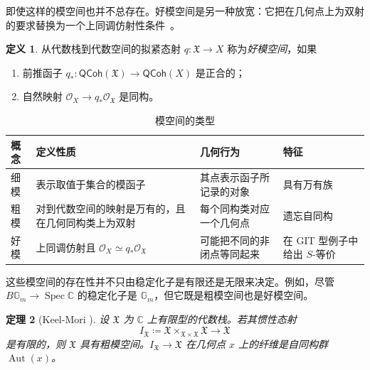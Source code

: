 \documentclass{amsart}
\newtheorem{thm}{定理}[section]
\theoremstyle{definition}
\newtheorem{defn}[thm]{定义}
\theoremstyle{remark}
\theoremstyle{plain}
\theoremstyle{definition}
\theoremstyle{remark}
\newcommand{\G}{\mathbb{G}}
\newcommand{\C}{\mathbb{C}}
\newcommand{\mc}[1]{\mathcal{#1}}
\newcommand{\mf}[1]{\mathfrak{#1}}
\newcommand{\on}[1]{\operatorname{#1}}
\newcommand{\ms}[1]{\mathsf{#1}}
\newcommand{\1}{\mathbf{1}}
\newcommand{\2}{\mathbf{2}}
\newcommand{\3}{\mathbf{3}}
\begin{document}
即使这样的模空间也并不总存在。好模空间是另一种放宽：它把在几何点上为双射的要求替换为一个上同调仿射性条件~\cite{Alper2013}。

\begin{defn}
    从代数栈到代数空间的拟紧态射 \(q\colon\mf{X}\to X\) 称为\textit{好模空间}，如果
    \begin{enumerate}
        \item 前推函子 \(q_*\colon\ms{QCoh}(\mf{X})\to\ms{QCoh}(X)\) 是正合的；
        \item 自然映射 \(\mc{O}_X\to q_*\mc{O}_{\mf{X}}\) 是同构。
    \end{enumerate}
\end{defn}

\begin{table}[htpb]
    \centering
    \caption{模空间的类型}
    \label{tab:moduli-types-corrected}
    \renewcommand{\arraystretch}{1.3}
    \begin{tabular}{
        p{}
        p{}
        p{}
        p{}
    }
        \toprule
        \textbf{概念}
        & \textbf{定义性质}
        & \textbf{几何行为}
        & \textbf{特征}
        \\
        \midrule
        细模
        & 表示取值于集合的模函子
        & 其点表示函子所记录的对象
        & 具有万有族
        \\
        粗模
        & 对到代数空间的映射是万有的，且在几何同构类上为双射
        & 每个同构类对应一个几何点
        & 遗忘自同构
        \\
        好模
        & 上同调仿射且
          \(\mc{O}_X \simeq q_*\mc{O}_{\mf{X}}\)
        & 可能把不同的非闭点等同起来
        & 在 GIT 型例子中给出 \(S\)-等价
        \\
        \bottomrule
    \end{tabular}
\end{table}

这些模空间的存在性并不只由稳定化子是有限还是无限来决定。例如，尽管 \(B\G_m\to\on{Spec}\C\) 的稳定化子是 \(\G_m\)，但它既是粗模空间也是好模空间。

\begin{thm}[Keel-Mori {\cite{KeelMori1997}}]
    设 \(\mf{X}\) 为 \(\C\) 上有限型的代数栈。若其惯性态射
    \[
        I_{\mf{X}}
        \coloneqq
        \mf{X}\times_{\mf{X}\times\mf{X}}\mf{X}
        \longrightarrow \mf{X}
    \]
    是有限的，则 \(\mf{X}\) 具有粗模空间。\(I_{\mf{X}}\to\mf{X}\) 在几何点 \(x\) 上的纤维是自同构群 \(\on{Aut}(x)\)。
\end{thm}
\end{document}
